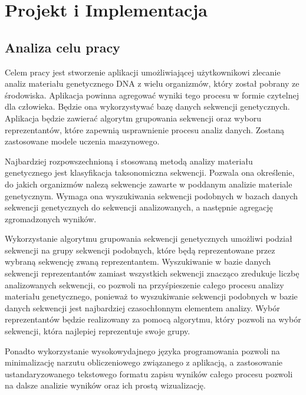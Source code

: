 \cleardoublepage
\section{Projekt i Implementacja}

    \subsection{Analiza celu pracy}

        Celem pracy jest stworzenie aplikacji umożliwiającej użytkownikowi zlecanie analiz materiału genetycznego DNA z wielu organizmów, który został pobrany ze środowiska. Aplikacja powinna agregować wyniki tego procesu w formie czytelnej dla człowieka. Będzie ona wykorzystywać bazę danych sekwencji genetycznych. Aplikacja będzie zawierać algorytm grupowania sekwencji oraz wyboru reprezentantów, które zapewnią usprawnienie procesu analiz danych. Zostaną zastosowane modele uczenia maszynowego.

        Najbardziej rozpowszechnioną i stosowaną metodą analizy materiału genetycznego jest klasyfikacja taksonomiczna sekwencji. Pozwala ona określenie, do jakich organizmów nalezą sekwencje zawarte w poddanym analizie materiale genetycznym. Wymaga ona wyszukiwania sekwencji podobnych w bazach danych sekwencji genetycznych do sekwencji analizowanych, a następnie agregację zgromadzonych wyników.

        Wykorzystanie algorytmu grupowania sekwencji genetycznych umożliwi podział sekwencji na grupy sekwencji podobnych, które będą reprezentowane przez wybraną sekwencję zwaną reprezentantem. Wyszukiwanie w bazie danych sekwencji reprezentantów zamiast wszystkich sekwencji znacząco zredukuje liczbę analizowanych sekwencji, co pozwoli na przyśpieszenie całego procesu analizy materiału genetycznego, ponieważ to wyszukiwanie sekwencji podobnych w bazie danych sekwencji jest najbardziej czasochłonnym elementem analizy. Wybór reprezentantów będzie realizowany za pomocą algorytmu, który pozwoli na wybór sekwencji, która najlepiej reprezentuje swoje grupy.

        Ponadto wykorzystanie wysokowydajnego języka programowania pozwoli na minimalizację narzutu obliczeniowego związanego z aplikacją, a zastosowanie ustandaryzowanego tekstowego formatu zapisu wyników całego procesu pozwoli na dalsze analizie wyników oraz ich prostą wizualizację.

